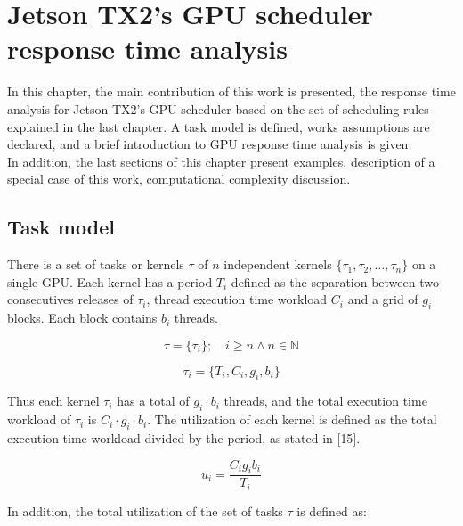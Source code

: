 \documentclass[
  12pt,
  a4paperpaper,
]{report}
\begin{document}
\newpage

\hypertarget{jetson-tx2s-gpu-scheduler-response-time-analysis}{%
\chapter{Jetson TX2's GPU scheduler response time
analysis}\label{jetson-tx2s-gpu-scheduler-response-time-analysis}}

In this chapter, the main contribution of this work is presented, the response time analysis for Jetson TX2's GPU scheduler based on the set of scheduling rules explained in the last chapter.
A task model is defined,  works assumptions are declared, and a brief introduction to GPU response time analysis is given.\\
In addition, the last sections of this chapter present examples, description of a special case of this work,  computational complexity discussion.

\hypertarget{task-model}{%
\section{Task model}\label{task-model}}

There is a set of tasks or kernels \(\tau\) of \(n\) independent kernels
\(\{\tau_1, \tau_2, \ldots, \tau_n\}\) on a single GPU. Each kernel has
a period \(T_i\) defined as the separation between two consecutives
releases of \(\tau_i\), thread execution time workload \(C_i\) and a
grid of \(g_i\) blocks. Each block contains \(b_i\) threads.

\begin{equation} 
\tau = \{ \tau_i \}; \quad i \geq n \wedge n \in \mathbb{N}
\end{equation}

\begin{equation} 
\tau_i = \{ T_i,  C_i,  g_i,  b_i \}
\label{eq:task_def}
\end{equation}

Thus each kernel \(\tau_i\) has a total of \(g_i\cdot b_i\) threads, and
the total execution time workload of \(\tau_i\) is
\(C_i \cdot g_i \cdot b_i\). The utilization of each kernel is defined
as the total execution time workload divided by the period, as stated in
{[}15{]}.

\begin{equation} 
u_i = \frac{C_i g_i b_i}{T_i}
\label{eq:task_utilization}
\end{equation}

In addition, the total utilization of the set of tasks \(\tau\) is
defined as:
\end{document}
